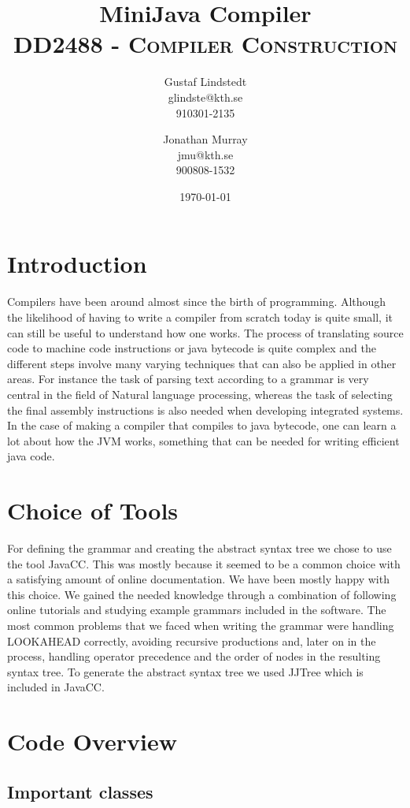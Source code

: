 \documentclass[paper=a4, fontsize=11pt]{scrartcl} %
\title{ 
\huge MiniJava Compiler \\ %
\vspace{10pt}
\normalfont \normalsize 
\textsc{DD2488 - Compiler Construction } \\ [25pt] %
}
\author{Gustaf Lindstedt \\ glindste@kth.se \\ 910301-2135 \and Jonathan Murray \\ jmu@kth.se \\ 900808-1532}
\date{\vspace{8pt}\normalsize\today} %
\numberwithin{equation}{section} %
\numberwithin{figure}{section} %
\numberwithin{table}{section} %
\begin{document}
\maketitle

\section{Introduction}

Compilers have been around almost since the birth of programming.
Although the likelihood of having to write a compiler from scratch today is quite small, it can still be useful to understand how one works.
The process of translating source code to machine code instructions or java bytecode is quite complex and the different steps involve many varying techniques that can also be applied in other areas.
For instance the task of parsing text according to a grammar is very central in the field of Natural language processing, whereas the task of selecting the final assembly instructions is also needed when developing integrated systems.
In the case of making a compiler that compiles to java bytecode, one can learn a lot about how the JVM works, something that can be needed for writing efficient java code.

\section{Choice of Tools}

For defining the grammar and creating the abstract syntax tree we chose to use the tool JavaCC.
This was mostly because it seemed to be a common choice with a satisfying amount of online documentation.
We have been mostly happy with this choice.
We gained the needed knowledge through a combination of following online tutorials and studying example grammars included in the software.
The most common problems that we faced when writing the grammar were handling LOOKAHEAD correctly, avoiding recursive productions and, later on in the process, handling operator precedence and the order of nodes in the resulting syntax tree.
To generate the abstract syntax tree we used JJTree which is included in JavaCC.

\section{Code Overview}

\subsection{Important classes}
\end{document}
